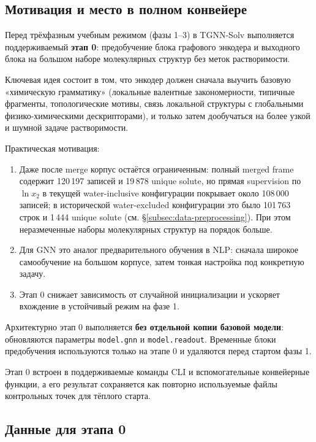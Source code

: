 \documentclass[11pt]{article}
\begin{document}
\subsection{Мотивация и место в полном конвейере}

Перед трёхфазным учебным режимом (фазы 1--3) в TGNN-Solv выполняется поддерживаемый \textbf{этап 0}: предобучение блока графового энкодера и выходного блока на большом наборе молекулярных структур без меток растворимости.

Ключевая идея состоит в том, что энкодер должен сначала выучить базовую «химическую грамматику» (локальные валентные закономерности, типичные фрагменты, топологические мотивы, связь локальной структуры с глобальными физико-химическими дескрипторами), и только затем дообучаться на более узкой и шумной задаче растворимости.

Практическая мотивация:
\begin{enumerate}
  \item Даже после merge корпус остаётся ограниченным: полный merged frame содержит 120\,197 записей и 19\,878 unique solute, но прямая supervision по $\ln x_2$ в текущей water-inclusive конфигурации покрывает около 108\,000 записей; в исторической water-excluded конфигурации это было 101\,763 строк и 1\,444 unique solute (см. §\ref{subsec:data-preprocessing}). При этом неразмеченные наборы молекулярных структур на порядок больше.
  \item Для GNN это аналог предварительного обучения в NLP: сначала широкое самообучение на большом корпусе, затем тонкая настройка под конкретную задачу.
  \item Этап 0 снижает зависимость от случайной инициализации и ускоряет вхождение в устойчивый режим на фазе 1.
\end{enumerate}

Архитектурно этап 0 выполняется \textbf{без отдельной копии базовой модели}: обновляются параметры \texttt{model.gnn} и \texttt{model.readout}. Временные блоки предобучения используются только на этапе 0 и удаляются перед стартом фазы 1.

Этап 0 встроен в поддерживаемые команды CLI и вспомогательные конвейерные функции, а его результат сохраняется как повторно используемые файлы контрольных точек для тёплого старта.

\subsection{Данные для этапа 0}
\end{document}
